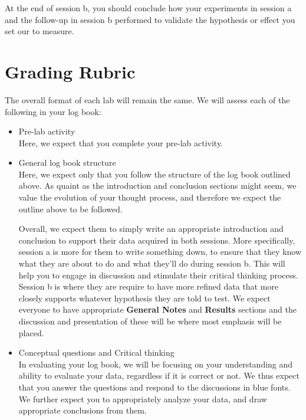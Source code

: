 \documentclass[12pt]{report}
\begin{document}
At the end of session b, you should conclude how your experiments in session a and the follow-up in session b performed to validate the hypothesis or effect you set our to measure.

\section{Grading Rubric}
The overall format of each lab will remain the same. We will assess each of the following in your log book:

\begin{itemize}   
\item Pre-lab activity \\
Here, we expect that you complete your pre-lab activity.

\item General log book structure \\
Here, we expect only that you follow the structure of the log book outlined above. As quaint as the introduction and conclusion sections might seem, we value the evolution of your thought process, and therefore we expect the outline above to be followed.

\begin{tcolorbox}
Overall, we expect them to simply write an appropriate introduction  and conclusion to support their data acquired in both sessions. More specifically, session a is more for them to write something down, to ensure that they know what they are about to do and what they'll do during session b. 
This will help you to engage in discussion and stimulate their critical thinking process. Session b is where they are require to have more refined data that more closely supports whatever hypothesis they are told to test.
We expect everyone to have appropriate \textbf{General Notes} and \textbf{Results} sections and the discussion and presentation of these will be where most emphasis will be placed.
\end{tcolorbox}

\item Conceptual questions and Critical thinking \\
In evaluating your log book, we will be focusing on your understanding and ability to evaluate your data, regardless if it is correct or not. {\color{blue} We thus expect that you answer the questions and respond to the discussions in blue fonts.}
We further expect you to appropriately analyze your data, and  draw appropriate conclusions from them.


\end{itemize}
\end{document}
